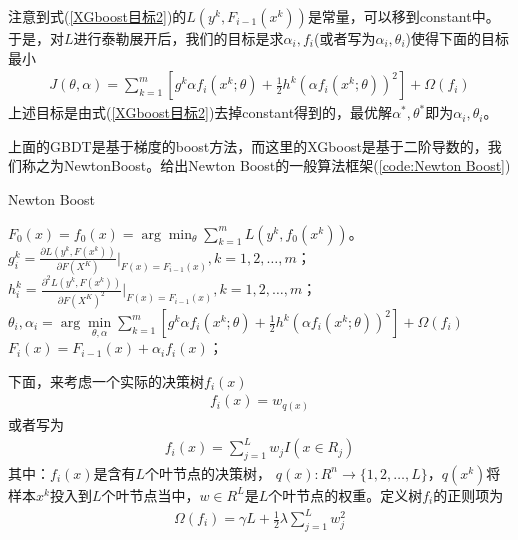           \par
          注意到式(\ref{XGboost目标2})的$L(y^k,F_{i-1}(x^k))$是常量，可以移到constant中。于是，对$L$进行泰勒展开后，我们的目标是求$\alpha_i,f_i$(或者写为$\alpha_i,\theta_i$)使得下面的目标最小
          \begin{align}
          \label{XGboost目标3}
          J(\theta,\alpha) = \sum_{k=1}^m \left[g^k\alpha f_i(x^k;\theta)+\frac{1}{2}h^k(\alpha f_i(x^k;\theta))^2 \right]+\Omega(f_i)
          \end{align}
          上述目标是由式(\ref{XGboost目标2})去掉constant得到的，最优解$\alpha^*,\theta^*$即为$\alpha_i,\theta_i$。
          \par
          上面的GBDT是基于梯度的boost方法，而这里的XGboost是基于二阶导数的，我们称之为NewtonBoost。给出Newton Boost的一般算法框架(\ref{code:Newton Boost})
              \begin{algorithm}[H]
                  \caption{Newton Boost}\label{code:Newton Boost}
                  \begin{algorithmic}[1]
                      \State $F_0(x) = f_0(x) = \arg\min_\theta \sum_{k=1}^m L(y^k,f_0(x^k))$。
                          \State $g_i^k =\frac{\partial L(y^k, F(x^k))}{\partial F(X^K)}\Big|_{F(x) = F_{i-1}(x)} ,k=1,2,\dots,m$；
                          \State $h_i^k =\frac{\partial^2 L(y^k, F(x^k))}{\partial F(X^K)^2}\Big|_{F(x) = F_{i-1}(x)} ,k=1,2,\dots,m$；
                          \State $\theta_i,\alpha_i = \arg\min\limits_{\theta,\alpha}\sum\limits_{k=1}^m \left[g^k\alpha f_i(x^k;\theta)+\frac{1}{2}h^k(\alpha f_i(x^k;\theta))^2 \right]+\Omega(f_i)$
                          \State $F_i(x) = F_{i-1}(x) + \alpha_if_i(x)$；
                      \EndFor
                  \end{algorithmic}
              \end{algorithm}
          \par
          下面，来考虑一个实际的决策树$f_i(x)$
          \begin{align*}
          f_i(x) = w_{q(x)}
          \end{align*}
          或者写为
          \begin{align*}
          f_i(x) = \sum_{j=1}^L w_j I(x\in R_j)
          \end{align*}
          其中：$f_i(x)$是含有$L$个叶节点的决策树， $q(x):R^n \to \{1,2,\dots,L\}$，$q(x^k)$将样本$x^k$投入到$L$个叶节点当中，$w\in R^L$是$L$个叶节点的权重。定义树$f_i$的正则项为
          \begin{align*}
          \Omega(f_i) = \gamma L+\frac{1}{2}\lambda \sum_{j=1}^L w_j^2
          \end{align*}
